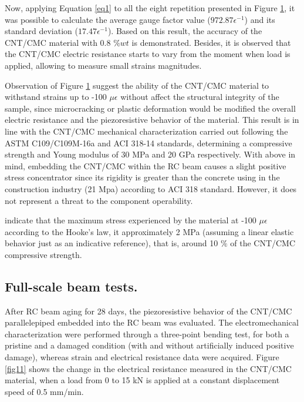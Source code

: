 \documentclass[twocolumn]{bmcart}%
\begin{document}
\begin{figure}[h!]
  \caption{
      }
      \label{fig10}
      \end{figure}


Now, applying Equation \ref{eq1} to all the eight repetition presented in Figure \ref{fig10}, it was possible to calculate the average gauge factor value ($972.87\epsilon^{-1}$) and its standard deviation  ($17.47 \epsilon^{-1}$). Based on this result, the accuracy of the CNT/CMC material with 0.8 $\%wt$ is demonstrated. Besides, it is observed that the CNT/CMC electric resistance starts to vary from the moment when load is applied, allowing to measure small strains magnitudes.


Observation of Figure \ref{fig10} suggest the ability of the CNT/CMC material to withstand strains up to -100 $\mu \epsilon$  without affect the structural integrity of the sample, since microcracking or plastic deformation  would be modified the overall electric resistance and the piezoresistive behavior of the material. This result is in line with the CNT/CMC mechanical characterization carried out following the  ASTM C109/C109M-16a and ACI 318-14 standards, determining a compressive strength and Young modulus of 30 MPa and  20 GPa respectively. With above in mind, embedding the CNT/CMC within the RC beam  causes a slight positive stress concentrator since its rigidity is greater than the concrete using in the construction industry (21 Mpa) according to ACI 318 standard. However, it does not represent a threat to the component operability. 

 indicate that the maximum stress experienced by the material at -100 $\mu \epsilon$ according to the Hooke’s law, it approximately 2 MPa (assuming a linear elastic behavior just as an indicative reference), that is, around 10 $\%$ of the CNT/CMC compressive strength. 


\subsection{ Full-scale beam tests.}

After RC beam aging for 28 days, the piezoresistive behavior of the CNT/CMC parallelepiped embedded into the RC beam was evaluated. The electromechanical characterization were performed through a three-point bending test, for both a pristine and a damaged condition (with and without artificially induced positive damage), whereas strain and electrical resistance data were acquired. Figure \ref{fig11} shows the change in the electrical resistance measured in the CNT/CMC material, when a load from 0 to 15 kN is applied at a constant displacement speed of 0.5 mm/min.
\end{document}
